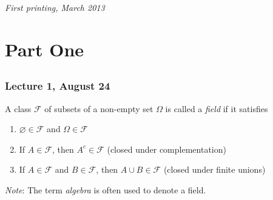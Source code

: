 \documentclass[11pt,fleqn]{book} %
\begin{document}
\noindent \textit{First printing, March 2013} %



\pagestyle{empty} %

\tableofcontents %

\cleardoublepage %

\pagestyle{fancy} %


\part{Part One}



\chapter{}

\section{Lecture 1, August 24}

\begin{definition}[Field] \label{def:1.1}
	A class $\mathcal{F}$ of subsets of a non-empty set $\Omega$ is called a \emph{field} if it satisfies
	\begin{enumerate}
		\item $\varnothing \in \mathcal{F}$ and $\Omega \in \mathcal{F}$
		\item If $A \in \mathcal{F}$, then $A^c \in \mathcal{F}$ (closed under complementation)
		\item If $A \in \mathcal{F}$ and $B \in \mathcal{F}$, then $A \cup B \in \mathcal{F}$ (closed under finite unions)
	\end{enumerate}
	\emph{Note}: The term \emph{algebra} is often used to denote a field.
\end{definition}
\end{document}

